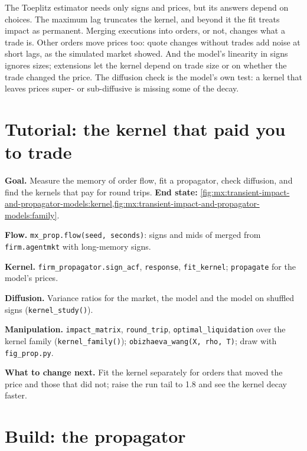 The Toeplitz estimator needs only signs and prices, but its answers depend on choices. The maximum lag truncates the kernel, and beyond it the fit treats
impact as permanent. Merging executions into orders, or not, changes what a trade is. Other orders move prices too: quote changes without trades add noise
at short lags, as the simulated market showed. And the model's linearity in signs ignores sizes; extensions let the kernel depend on trade size or on
whether the trade changed the price. The diffusion check is the model's own test: a kernel that leaves prices super- or sub-diffusive is missing some of
the decay.

\section{Tutorial: the kernel that paid you to trade}\label{tut:mx:transient-impact-and-propagator-models:tut}

\begin{tutorial}
\textbf{Goal.} Measure the memory of order flow, fit a propagator, check diffusion, and find the kernels that pay for round trips.
\textbf{End state:} \cref{fig:mx:transient-impact-and-propagator-models:kernel,fig:mx:transient-impact-and-propagator-models:family}.
\begin{tutsteps}
\item \textbf{Flow.} \texttt{mx\_prop.flow(seed, seconds)}: signs and mids of merged  from \texttt{firm.agentmkt} with long-memory signs.
\item \textbf{Kernel.} \texttt{firm\_propagator.sign\_acf}, \texttt{response}, \texttt{fit\_kernel}; \texttt{propagate} for the model's prices.
\item \textbf{Diffusion.} Variance ratios for the market, the model and the model on shuffled signs (\texttt{kernel\_study()}).
\item \textbf{Manipulation.} \texttt{impact\_matrix}, \texttt{round\_trip}, \texttt{optimal\_liquidation} over the kernel family (\texttt{kernel\_family()});
\texttt{obizhaeva\_wang(X, rho, T)}; draw with \texttt{fig\_prop.py}.
\end{tutsteps}
\textbf{What to change next.} Fit the kernel separately for orders that moved the price and those that did not; raise the run tail to 1.8 and see the
kernel decay faster.
\end{tutorial}

\section{Build: the propagator}\label{bld:mx:transient-impact-and-propagator-models:propagator}

